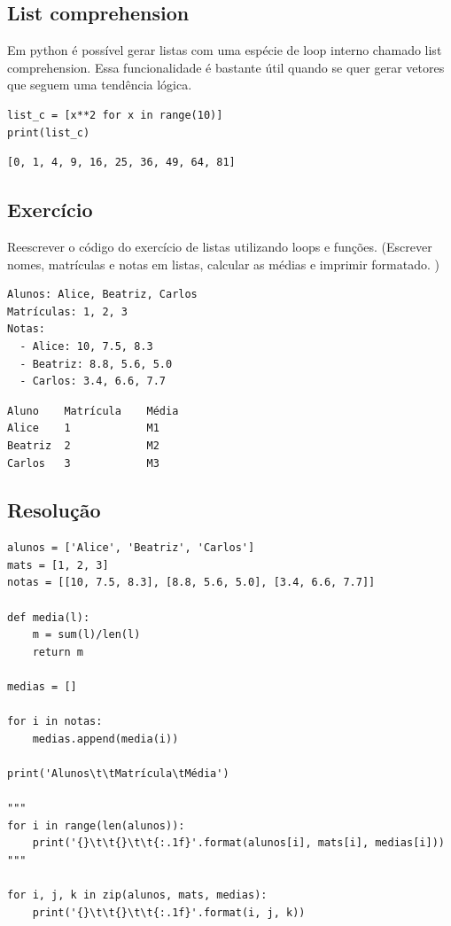 \documentclass[presentation]{beamer}
\begin{document}
\subsection{List comprehension}
\label{sec:orgheadline87}
Em python é possível gerar listas com uma espécie de loop interno chamado list comprehension. Essa funcionalidade é bastante útil quando se quer gerar vetores que seguem uma tendência lógica.

\begin{verbatim}
list_c = [x**2 for x in range(10)]
print(list_c)
\end{verbatim}

\begin{verbatim}
[0, 1, 4, 9, 16, 25, 36, 49, 64, 81]
\end{verbatim}
\subsection{Exercício}
\label{sec:orgheadline88}
Reescrever o código do exercício de listas utilizando loops e funções. (Escrever nomes, matrículas e notas em listas, calcular as médias e imprimir formatado. ) 

\begin{verbatim}
Alunos: Alice, Beatriz, Carlos
Matrículas: 1, 2, 3
Notas:
  - Alice: 10, 7.5, 8.3
  - Beatriz: 8.8, 5.6, 5.0
  - Carlos: 3.4, 6.6, 7.7
\end{verbatim}

\begin{verbatim}
Aluno    Matrícula    Média
Alice    1            M1
Beatriz  2            M2
Carlos   3            M3
\end{verbatim}
\subsection{Resolução}
\label{sec:orgheadline89}
\begin{verbatim}
alunos = ['Alice', 'Beatriz', 'Carlos']
mats = [1, 2, 3]
notas = [[10, 7.5, 8.3], [8.8, 5.6, 5.0], [3.4, 6.6, 7.7]]

def media(l):
    m = sum(l)/len(l)
    return m

medias = []

for i in notas:
    medias.append(media(i))

print('Alunos\t\tMatrícula\tMédia')

"""
for i in range(len(alunos)): 
    print('{}\t\t{}\t\t{:.1f}'.format(alunos[i], mats[i], medias[i]))
"""

for i, j, k in zip(alunos, mats, medias):
    print('{}\t\t{}\t\t{:.1f}'.format(i, j, k))
\end{verbatim}
\end{document}
